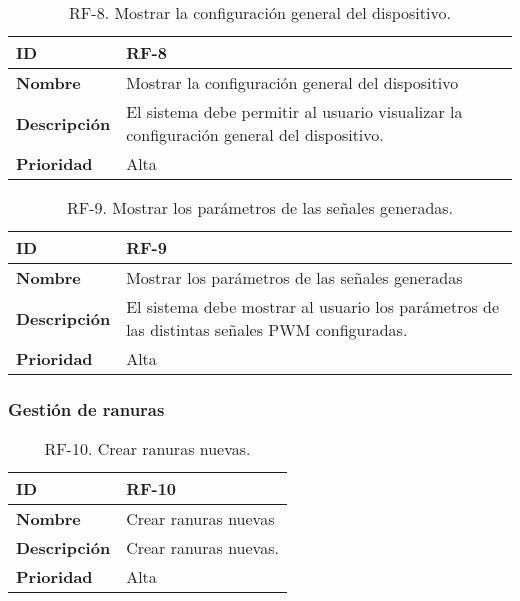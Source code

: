 \begin{table}[h!]
    \centering
    \begin{tabular}{|m{2.5cm}|m{9.27cm}|}
        \hline
        \textbf{ID} & RF-8 \\
        \hline
        \textbf{Nombre} & Mostrar la configuración general del dispositivo \\
        \hline
        \textbf{Descripción} & El sistema debe permitir al usuario visualizar la configuración general del dispositivo. \\
        \hline
        \textbf{Prioridad} & Alta \\
        \hline
    \end{tabular}
    \caption{RF-8. Mostrar la configuración general del dispositivo.}
\end{table}

\begin{table}[h!]
    \centering
    \begin{tabular}{|m{2.5cm}|m{9.27cm}|}
        \hline
        \textbf{ID} & RF-9 \\
        \hline
        \textbf{Nombre} & Mostrar los parámetros de las señales generadas \\
        \hline
        \textbf{Descripción} & El sistema debe mostrar al usuario los parámetros de las distintas señales PWM configuradas. \\
        \hline
        \textbf{Prioridad} & Alta \\
        \hline
    \end{tabular}
    \caption{RF-9. Mostrar los parámetros de las señales generadas.}
\end{table}

\subsubsection{Gestión de ranuras}

\begin{table}[h!]
    \centering
    \begin{tabular}{|m{2.5cm}|m{9.27cm}|}
        \hline
        \textbf{ID} & RF-10 \\
        \hline
        \textbf{Nombre} & Crear ranuras nuevas \\
        \hline
        \textbf{Descripción} & Crear ranuras nuevas. \\
        \hline
        \textbf{Prioridad} & Alta \\
        \hline
    \end{tabular}
    \caption{RF-10. Crear ranuras nuevas.}
\end{table}

